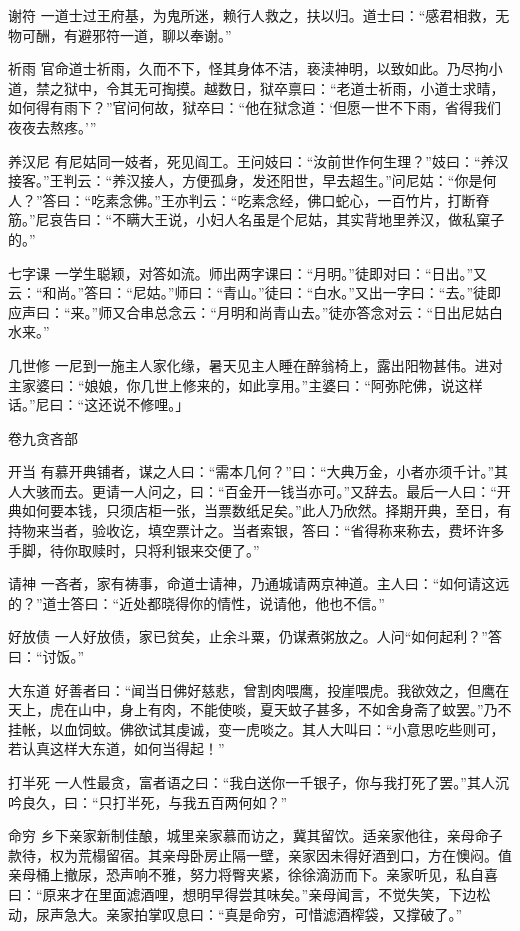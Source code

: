 \documentclass[12pt,UTF8]{ctexbook}
\begin{document}
谢符
一道士过王府基，为鬼所迷，赖行人救之，扶以归。道士曰：“感君相救，无物可酬，有避邪符一道，聊以奉谢。”

祈雨
官命道士祈雨，久而不下，怪其身体不洁，亵渎神明，以致如此。乃尽拘小道，禁之狱中，令其无可掏摸。越数日，狱卒禀曰：“老道士祈雨，小道士求晴，如何得有雨下？”官问何故，狱卒曰：“他在狱念道：‘但愿一世不下雨，省得我们夜夜去熬疼。’”

养汉尼
有尼姑同一妓者，死见阎工。王问妓曰：“汝前世作何生理？”妓曰：“养汉接客。”王判云：“养汉接人，方便孤身，发还阳世，早去超生。”问尼姑：“你是何人？”答曰：“吃素念佛。”王亦判云：“吃素念经，佛口蛇心，一百竹片，打断脊筋。”尼哀告曰：“不瞒大王说，小妇人名虽是个尼姑，其实背地里养汉，做私窠子的。”

七字课
一学生聪颖，对答如流。师出两字课曰：“月明。”徒即对曰：“日出。”又云：“和尚。”答曰：“尼姑。”师曰：“青山。”徒曰：“白水。”又出一字曰：“去。”徒即应声曰：“来。”师又合串总念云：“月明和尚青山去。”徒亦答念对云：“日出尼姑白水来。”

几世修
一尼到一施主人家化缘，暑天见主人睡在醉翁椅上，露出阳物甚伟。进对主家婆曰：“娘娘，你几世上修来的，如此享用。”主婆曰：“阿弥陀佛，说这样话。”尼曰：“这还说不修哩。」

卷九贪吝部

开当
有慕开典铺者，谋之人曰：“需本几何？”曰：“大典万金，小者亦须千计。”其人大骇而去。更请一人问之，曰：“百金开一钱当亦可。”又辞去。最后一人曰：“开典如何要本钱，只须店柜一张，当票数纸足矣。”此人乃欣然。择期开典，至日，有持物来当者，验收讫，填空票计之。当者索银，答曰：“省得称来称去，费坏许多手脚，待你取赎时，只将利银来交便了。”

请神
一吝者，家有祷事，命道士请神，乃通城请两京神道。主人曰：“如何请这远的？”道士答曰：“近处都晓得你的情性，说请他，他也不信。”

好放债
一人好放债，家已贫矣，止余斗粟，仍谋煮粥放之。人问“如何起利？”答曰：“讨饭。”

大东道
好善者曰：“闻当日佛好慈悲，曾割肉喂鹰，投崖喂虎。我欲效之，但鹰在天上，虎在山中，身上有肉，不能使啖，夏天蚊子甚多，不如舍身斋了蚊罢。”乃不挂帐，以血饲蚊。佛欲试其虔诚，变一虎啖之。其人大叫曰：“小意思吃些则可，若认真这样大东道，如何当得起！”

打半死
一人性最贪，富者语之曰：“我白送你一千银子，你与我打死了罢。”其人沉吟良久，曰：“只打半死，与我五百两何如？”

命穷
乡下亲家新制佳酿，城里亲家慕而访之，冀其留饮。适亲家他往，亲母命子款待，权为荒榻留宿。其亲母卧房止隔一壁，亲家因未得好酒到口，方在懊闷。值亲母桶上撤尿，恐声响不雅，努力将臀夹紧，徐徐滴沥而下。亲家听见，私自喜曰：“原来才在里面滤酒哩，想明早得尝其味矣。”亲母闻言，不觉失笑，下边松动，尿声急大。亲家拍掌叹息曰：“真是命穷，可惜滤酒榨袋，又撑破了。”
\end{document}
